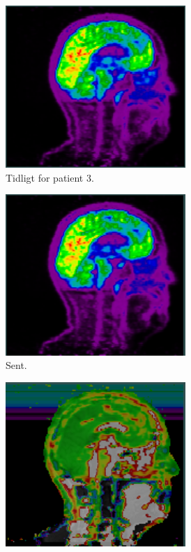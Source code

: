 \begin{figure}
\begin{subfigure}{0.3\textwidth}
        \includegraphics[width=0.75\textwidth]{colager/over_tid_pet/over_tid_210445_early.png}
        \caption{Tidligt for patient 3.}
        \label{col:over_time_pet_pat3_early}
    \end{subfigure}\hfill
    \begin{subfigure}{0.3\textwidth}
        \centering
        \includegraphics[width=0.75\textwidth]{colager/over_tid_pet/over_tid_210445_late.png}
        \caption{Sent.}
        \label{col:over_time_pet_pat3_late}
    \end{subfigure}\hfill
    \begin{subfigure}{0.3\textwidth}
        \centering
        \includegraphics[width=0.75\textwidth]{colager/over_tid_pet/over_tid_210445_pd.png}

\end{subfigure}
\end{figure}
